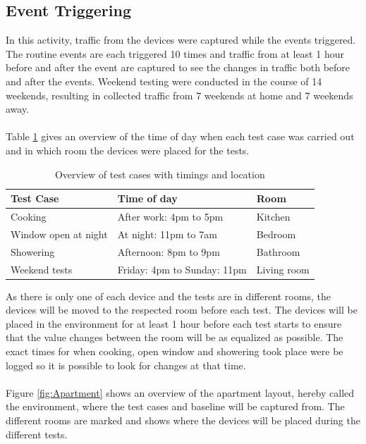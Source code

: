 \subsection{Event Triggering}
In this activity, traffic from the devices were captured while the events triggered. The routine events are each triggered 10 times and traffic from at least 1 hour before and after the event are captured to see the changes in traffic both before and after the events. Weekend testing were conducted in the course of 14 weekends, resulting in collected traffic from 7 weekends at home and 7 weekends away. 
\\\\
Table \ref{tab:TestCases} gives an overview of the time of day when each test case was carried out and in which room the devices were placed for the tests. 
\begin{table}[H]
    \centering
    \caption{Overview of test cases with timings and location}
    \begin{adjustbox}{width=1\textwidth}
    \begin{tabular}{| p{5cm} | p{5cm} | p{3cm} |} 
        \hline
        \textbf{Test Case} & \textbf{Time of day} & \textbf{Room} \\
        \hline
        Cooking & After work: 4pm to 5pm & Kitchen \\
        \hline
        Window open at night & At night: 11pm to 7am & Bedroom\\
        \hline
        Showering & Afternoon: 8pm to 9pm & Bathroom \\
        \hline
        Weekend tests & Friday: 4pm to Sunday: 11pm & Living room \\
        \hline
    \end{tabular}
    \end{adjustbox}
    \label{tab:TestCases}
\end{table}

As there is only one of each device and the tests are in different rooms, the devices will be moved to the respected room before each test. The devices will be placed in the environment for at least 1 hour before each test starts to ensure that the value changes between the room will be as equalized as possible. The exact times for when cooking, open window and showering took place were be logged so it is possible to look for changes at that time. 
\\\\
Figure \ref{fig:Apartment} shows an overview of the apartment layout, hereby called the environment, where the test cases and baseline will be captured from. The different rooms are marked and shows where the devices will be placed during the different tests. 

